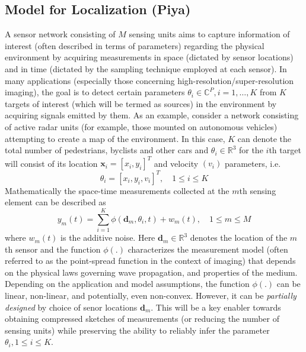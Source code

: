 \documentclass{article}
\begin{document}
\subsection{Model for Localization (Piya)} A sensor network consisting of $M$ sensing units aims to capture information of interest (often described in terms of parameters) regarding the physical environment by acquiring measurements in space (dictated by sensor locations) and in time (dictated by the sampling technique employed at each sensor). In many applications (especially those concerning high-resolution/super-resolution imaging), the goal is to detect certain parameters $\theta_i\in\mathbb{C}^P, i=1,\ldots,K$ from $K$ targets of interest (which will be termed as sources) in the environment by acquiring signals emitted by them. As an example, consider a network consisting of active radar units (for example, those mounted on autonomous vehicles) attempting to create a map of the environment. In this case, $K$ can denote the total number of pedestrians, byclists and other cars and $\theta_i\in\mathbb{R}^3$ for the $i$th target will consist of its location $\mathbf{x}_i=[x_i,y_i]^T$ and velocity $(v_i)$ parameters, i.e.
\begin{equation} \theta_i = [ x_i, y_i, v_i ]^T, \quad 1\leq i\leq K  
\end{equation} 
Mathematically the space-time measurements collected at the $m$th sensing element can be described as \begin{equation} 
y_m (t) = \sum_{i=1}^{K} \phi (\mathbf{d}_m,\theta_i,t) + w_m(t), \quad 1\leq m\leq M
\end{equation}
where $w_m(t)$ is the additive noise. Here $\mathbf{d}_m\in \mathbb{R}^3$ denotes the location of the $m$th sensor and the function $\phi(.)$ characterizes the measurement model (often referred to as the point-spread function in the context of imaging) that depends on the physical laws governing wave propagation, and properties of the medium. Depending on the application and model assumptions, the function $\phi(.)$ can be linear, non-linear, and potentially, even non-convex. However, it can be {\em partially designed} by choice of senor locations $\mathbf{d}_m$. This will be a key enabler towards obtaining compressed sketches of measurements (or reducing the number of sensing units) while preserving the ability to reliably infer the parameter $\theta_i, 1\leq i\leq K$.\\

\end{document}
